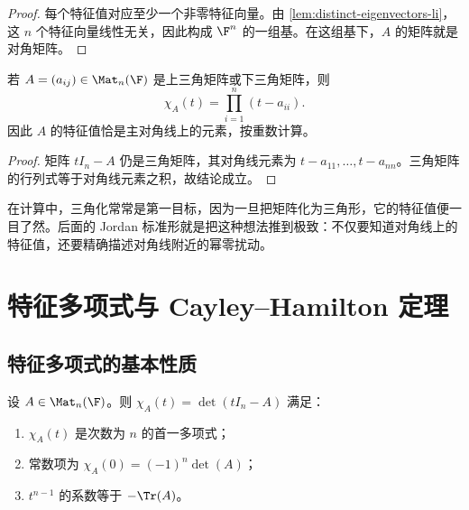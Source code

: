 \begin{proof}
每个特征值对应至少一个非零特征向量。由 \cref{lem:distinct-eigenvectors-li}，这 \(n\) 个特征向量线性无关，因此构成 \(\F^n\) 的一组基。在这组基下，\(A\) 的矩阵就是对角矩阵。
\end{proof}

\begin{proposition}
若 \(A=(a_{ij})\in \Mat_n(\F)\) 是上三角矩阵或下三角矩阵，则
\[
\chi_A(t)=\prod_{i=1}^n(t-a_{ii}).
\]
因此 \(A\) 的特征值恰是主对角线上的元素，按重数计算。
\end{proposition}

\begin{proof}
矩阵 \(tI_n-A\) 仍是三角矩阵，其对角线元素为 \(t-a_{11},\dots,t-a_{nn}\)。三角矩阵的行列式等于对角线元素之积，故结论成立。
\end{proof}

\begin{remark}
在计算中，三角化常常是第一目标，因为一旦把矩阵化为三角形，它的特征值便一目了然。后面的 Jordan 标准形就是把这种想法推到极致：不仅要知道对角线上的特征值，还要精确描述对角线附近的幂零扰动。
\end{remark}

\section{特征多项式与 Cayley--Hamilton 定理}\label{sec:charpoly-CH}

\subsection{特征多项式的基本性质}

\begin{proposition}\label{prop:charpoly-basic}
设 \(A\in \Mat_n(\F)\)。则 \(\chi_A(t)=\det(tI_n-A)\) 满足：
\begin{enumerate}[label=(\arabic*), leftmargin=2.4em]
  \item \(\chi_A(t)\) 是次数为 \(n\) 的首一多项式；
  \item 常数项为 \(\chi_A(0)=(-1)^n\det(A)\)；
  \item \(t^{n-1}\) 的系数等于 \(-\Tr(A)\)。
\end{enumerate}
\end{proposition}

